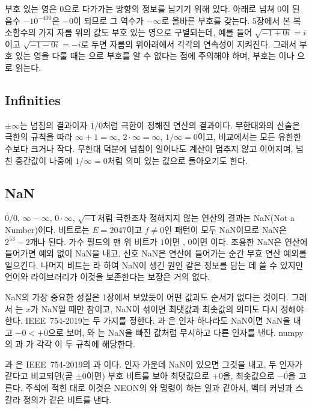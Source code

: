 부호 있는 영은 $0$으로 다가가는 방향의 정보를 남기기 위해 있다. 아래로 넘쳐 $0$이 된 음수 $-10^{-400}$은 $-0$이 되므로 그 역수가 $-\infty$로 올바른 부호를 갖는다. 5장에서 본 복소함수의 가지 자름 위의 값도 부호 있는 영으로 구별되는데, 예를 들어 $\sqrt{-1+0i}=i$이고 $\sqrt{-1-0i}=-i$로 두면 자름의 위아래에서 각각의 연속성이 지켜진다\cite{kahan1987branch}. 그래서 부호 있는 영을 다룰 때는 으로 부호를 알 수 없다는 점에 주의해야 하며, 부호는 이나 으로 읽는다.

\subsection{Infinities}

$\pm\infty$는 넘침의 결과이자 $1/0$처럼 극한이 정해진 연산의 결과이다. 무한대와의 산술은 극한의 규칙을 따라 $\infty+1=\infty$, $2\cdot\infty=\infty$, $1/\infty=0$이고, 비교에서는 모든 유한한 수보다 크거나 작다. 무한대 덕분에 넘침이 일어나도 계산이 멈추지 않고 이어지며, 넘친 중간값이 나중에 $1/\infty=0$처럼 의미 있는 값으로 돌아오기도 한다.

\subsection{NaN}

$0/0$, $\infty-\infty$, $0\cdot\infty$, $\sqrt{-1}$처럼 극한조차 정해지지 않는 연산의 결과는 NaN(Not a Number)이다. 비트로는 $E=2047$이고 $f\ne0$인 패턴이 모두 NaN이므로 NaN은 $2^{53}-2$개나 된다. 가수 필드의 맨 위 비트가 $1$이면 , $0$이면 이다. 조용한 NaN은 연산에 들어가면 예외 없이 NaN을 내고, 신호 NaN은 연산에 들어가는 순간 무효 연산 예외를 일으킨다. 나머지 비트는 라 하여 NaN이 생긴 원인 같은 정보를 담는 데 쓸 수 있지만 언어와 라이브러리가 이것을 보존한다는 보장은 거의 없다.

NaN의 가장 중요한 성질은 1장에서 보았듯이 어떤 값과도 순서가 없다는 것이다. 그래서 는 $x$가 NaN일 때만 참이고, NaN이 섞이면 최댓값과 최솟값의 의미도 다시 정해야 한다. IEEE~754-2019는 두 가지를 정한다. 과 은 인자 하나라도 NaN이면 NaN을 내고 $-0<+0$으로 보며, 와 는 NaN을 빠진 값처럼 무시하고 다른 인자를 낸다\cite{ieee754-2019}. numpy의 과 가 각각 이 두 규칙에 해당한다.

\begin{instardust}
과 은 IEEE~754-2019의 과 이다. 인자 가운데 NaN이 있으면 그것을 내고, 두 인자가 같다고 비교되면(곧 $\pm0$이면) 부호 비트를 보아 최댓값으로 $+0$을, 최솟값으로 $-0$을 고른다. 주석에 적힌 대로 이것은 NEON의 와  명령이 하는 일과 같아서, 벡터 커널과 스칼라 정의가 같은 비트를 낸다.
\end{instardust}

